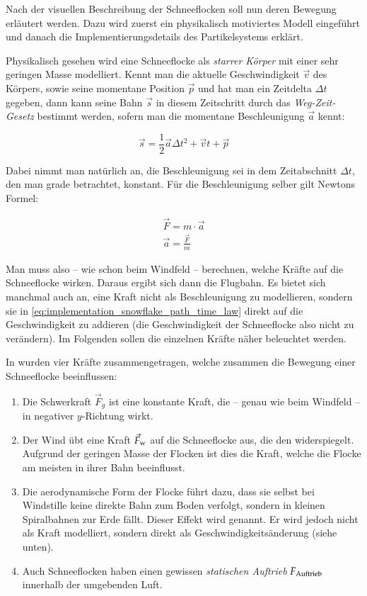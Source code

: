 Nach der visuellen Beschreibung der Schneeflocken soll nun deren
Bewegung erläutert werden. Dazu wird zuerst ein physikalisch
motiviertes Modell eingeführt und danach die Implementierungsdetails
des Partikelsystems erklärt.

Physikalisch gesehen wird eine Schneeflocke als \emph{starrer Körper}
mit einer sehr geringen Masse modelliert. Kennt man die aktuelle
Geschwindigkeit $\vec{v}$ des Körpers, sowie seine momentane Position
$\vec{p}$ und hat man ein Zeitdelta $\Delta t$ gegeben, dann kann
seine Bahn $\vec{s}$ in diesem Zeitschritt durch das
\emph{Weg-Zeit-Gesetz} bestimmt werden, sofern man die momentane
Beschleunigung $\vec{a}$ kennt:

\begin{equation}
\label{eq:implementation_snowflake_path_time_law}
\vec{s} = \frac{1}{2} \vec{a} \Delta t^2 + \vec{v}t + \vec{p}
\end{equation}

Dabei nimmt man natürlich an, die Beschleunigung sei in dem
Zeitabschnitt $\Delta t$, den man grade betrachtet, konstant. Für die
Beschleunigung selber gilt Newtons Formel:

\begin{gather}
\vec{F} = m \cdot \vec{a} \\
\vec{a} = \frac{\vec{F}}{m}
\end{gather}

Man muss also -- wie schon beim Windfeld -- berechnen, welche Kräfte
auf die Schneeflocke wirken. Daraus ergibt sich dann die Flugbahn. Es
bietet sich manchmal auch an, eine Kraft nicht als Beschleunigung zu
modellieren, sondern sie in
\autoref{eq:implementation_snowflake_path_time_law} direkt auf die
Geschwindigkeit zu addieren (die Geschwindigkeit der Schneeflocke also
nicht zu verändern). Im Folgenden sollen die einzelnen Kräfte
näher beleuchtet werden.

In \cite{Aagaard2004} wurden vier Kräfte zusammengetragen, welche
zusammen die Bewegung einer Schneeflocke beeinflussen:

\begin{enumerate}
\item Die Schwerkraft $\vec{F}_g$ ist eine konstante Kraft, die
-- genau wie beim Windfeld -- in negativer $y$-Richtung wirkt.
\item Der Wind übt eine Kraft $\vec{F}_{\textnormal{w}}$
auf die Schneeflocke aus, die den 
widerspiegelt. Aufgrund der geringen Masse der Flocken ist dies die
Kraft, welche die Flocke am meisten in ihrer Bahn beeinflusst.
\item Die aerodynamische Form der Flocke führt dazu, dass sie selbst bei
Windstille keine direkte Bahn zum Boden verfolgt, sondern in kleinen
Spiralbahnen zur Erde fällt. Dieser Effekt wird
 genannt. Er wird jedoch nicht
als Kraft modelliert, sondern direkt als Geschwindigkeitsänderung (siehe unten).
\item Auch Schneeflocken haben einen gewissen \emph{statischen
Auftrieb} $F_{\textnormal{Auftrieb}}$ innerhalb der umgebenden
Luft.
\end{enumerate}

